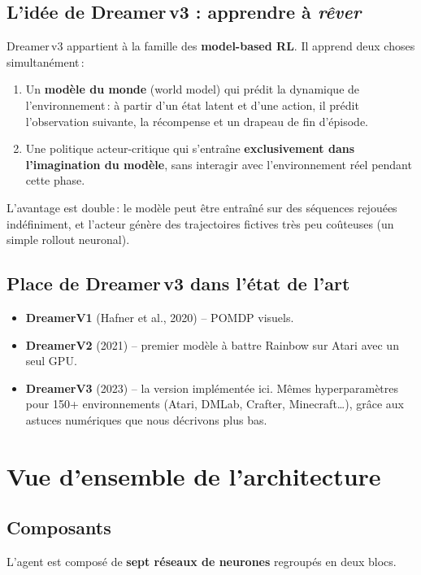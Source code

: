 \documentclass[11pt,a4paper]{article}
\newcommand{\dreamer}{Dreamer\,v3}
\newcommand{\bluebf}[1]{\textbf{\color{enseirbblue}#1}}
\begin{document}
\subsection{L'idée de \dreamer{} : apprendre à \emph{rêver}}
\dreamer{} appartient à la famille des \bluebf{model-based RL}. Il apprend
deux choses simultanément\,:
\begin{enumerate}
    \item Un \bluebf{modèle du monde} (world model) qui prédit la dynamique
          de l'environnement\,: à partir d'un état latent et d'une action,
          il prédit l'observation suivante, la récompense et un drapeau de
          fin d'épisode.
    \item Une politique acteur-critique qui s'entraîne \bluebf{exclusivement
          dans l'imagination du modèle}, sans interagir avec l'environnement
          réel pendant cette phase.
\end{enumerate}

L'avantage est double\,: le modèle peut être entraîné sur des séquences
rejouées indéfiniment, et l'acteur génère des trajectoires fictives très
peu coûteuses (un simple rollout neuronal).

\subsection{Place de \dreamer{} dans l'état de l'art}
\begin{itemize}
    \item \textbf{DreamerV1} (Hafner et al., 2020) -- POMDP visuels.
    \item \textbf{DreamerV2} (2021) -- premier modèle à battre Rainbow sur
          Atari avec un seul GPU.
    \item \textbf{DreamerV3} (2023) -- la version implémentée ici. Mêmes
          hyperparamètres pour 150+ environnements (Atari, DMLab, Crafter,
          Minecraft\dots), grâce aux astuces numériques que nous décrivons
          plus bas.
\end{itemize}

\section{Vue d'ensemble de l'architecture}

\subsection{Composants}
L'agent est composé de \bluebf{sept réseaux de neurones} regroupés en deux
blocs.
\end{document}
